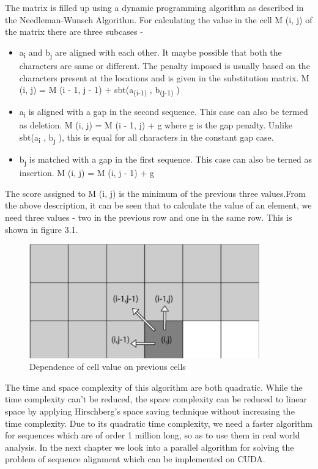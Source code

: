 \documentclass[a4paper,11pt]{report}
\begin{document}
The matrix is filled up using a dynamic programming algorithm as described in the
Needleman-Wunsch Algorithm. For calculating the value in the cell M (i, j) of the matrix there are
three subcases -
\begin{itemize}
  \item  a\textsubscript{i} and b\textsubscript{j} are aligned with each other. It maybe possible that both the characters are same or different. The penalty imposed is usually based on the characters present at the locations and is given in
the substitution matrix. \newline
M (i, j) = M (i - 1, j - 1) + sbt(a\textsubscript{(i-1)} , b\textsubscript{(j-1)} )
\item a\textsubscript{i} is aligned with a gap in the second sequence. This case can also be termed as deletion. \newline
M (i, j) = M (i - 1, j) + g  \newline
where g is the gap penalty. Unlike sbt(a\textsubscript{i} , b\textsubscript{j} ), this is equal for all characters in the constant gap case.
\item b\textsubscript{j} is matched with a gap in the first sequence. This case can also be terned as insertion. \newline
M (i, j) = M (i, j - 1) + g
\end{itemize}

The score assigned to M (i, j) is the minimum of the previous three values.From the above description, it can be seen that to calculate the value of an element, we need three
values - two in the previous row and one in the same row. This is shown in figure 3.1.\begin{figure}
  \begin{center}
    \includegraphics[width=10cm]{images/fig1}
    \caption{Dependence of cell value on previous cells}
    \label{fig:}
  \end{center}
\end{figure}

The time and space complexity of this algorithm are both quadratic. While the time complexity
can’t be reduced, the space complexity can be reduced to linear space by applying Hirschberg’s
space saving technique without increasing the time complexity.
Due to its quadratic time complexity, we need a faster algorithm for sequences which are of order 1 million long, so as to use them in real world analysis.
In the next chapter we look into a parallel algorithm for solving the problem of sequence alignment which can be implemented on CUDA.
\end{document}
